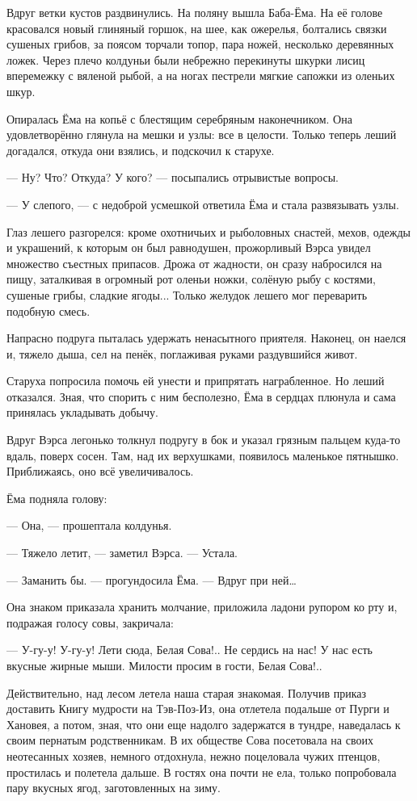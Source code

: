 \documentclass[oneside,final,14pt]{extreport}
\begin{document}
	Вдруг ветки кустов раздвинулись. На поляну вышла Баба-Ёма. На её голове красовался новый глиняный горшок, на шее, как ожерелья, болтались связки сушеных грибов, за поясом торчали топор, пара ножей, несколько деревянных ложек. Через плечо колдуньи были небрежно перекинуты шкурки лисиц вперемежку с вяленой рыбой, а на ногах пестрели мягкие сапожки из оленьих шкур.
	
	Опиралась Ёма на копьё с блестящим серебряным наконечником. Она удовлетворённо глянула на мешки и узлы: все в целости. Только теперь леший догадался, откуда они взялись, и подскочил к старухе.
	
	— Ну? Что? Откуда? У кого? — посыпались отрывистые вопросы.
	
	— У слепого, — с недоброй усмешкой ответила Ёма и стала развязывать узлы.
	
	Глаз лешего разгорелся: кроме охотничьих и рыболовных снастей, мехов, одежды и украшений, к которым он был равнодушен, прожорливый Вэрса увидел множество съестных припасов. Дрожа от жадности, он сразу набросился на пищу, заталкивая в огромный рот оленьи ножки, солёную рыбу с костями, сушеные грибы, сладкие ягоды... Только желудок лешего мог переварить подобную смесь.
	
	Напрасно подруга пыталась удержать ненасытного приятеля. Наконец, он наелся и, тяжело дыша, сел на пенёк, поглаживая руками раздувшийся живот.
	
	Старуха попросила помочь ей унести и припрятать награбленное. Но леший отказался. Зная, что спорить с ним бесполезно, Ёма в сердцах плюнула и сама принялась укладывать добычу.
	
	Вдруг Вэрса легонько толкнул подругу в бок и указал грязным пальцем куда-то вдаль, поверх сосен. Там, над их верхушками, появилось маленькое пятнышко. Приближаясь, оно всё увеличивалось.
	
	Ёма подняла голову:
	
	— Она, — прошептала колдунья.
	
	— Тяжело летит, — заметил Вэрса. — Устала.
	
	— Заманить бы. — прогундосила Ёма. — Вдруг при ней…
	
	Она знаком приказала хранить молчание, приложила ладони рупором ко рту и, подражая голосу совы, закричала:
	
	— У-гу-у! У-гу-у! Лети сюда, Белая Сова!.. Не сердись на нас! У нас есть вкусные жирные мыши. Милости просим в гости, Белая Сова!..
	
	Действительно, над лесом летела наша старая знакомая. Получив приказ доставить Книгу мудрости на Тэв-Поз-Из, она отлетела подальше от Пурги и Хановея, а потом, зная, что они еще надолго задержатся в тундре, наведалась к своим пернатым родственникам. В их обществе Сова посетовала на своих неотесанных хозяев, немного отдохнула, нежно поцеловала чужих птенцов, простилась и полетела дальше. В гостях она почти не ела, только попробовала пару вкусных ягод, заготовленных на зиму.
	
\end{document}
